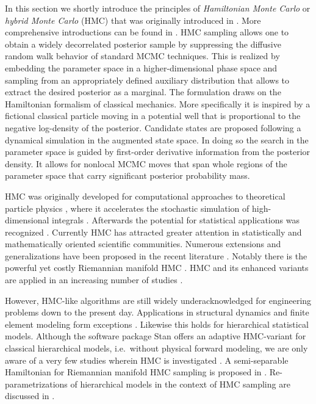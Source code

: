 In this section we shortly introduce the principles of \textit{Hamiltonian Monte Carlo} or \textit{hybrid Monte Carlo} (HMC) that was originally introduced in \cite{MCMC:Duane1987}.
More comprehensive introductions can be found in \cite{MCMC:Liu2004,MCMC:Neal2011,MCMC:SanzSerna2014}.
HMC sampling allows one to obtain a widely decorrelated posterior sample by suppressing the diffusive random walk behavior of standard MCMC techniques.
This is realized by embedding the parameter space in a higher-dimensional phase space and sampling from an appropriately defined auxiliary distribution that allows to extract the desired posterior as a marginal.
The formulation draws on the Hamiltonian formalism of classical mechanics.
More specifically it is inspired by a fictional classical particle moving in a potential well that is proportional to the negative log-density of the posterior.
Candidate states are proposed following a dynamical simulation in the augmented state space.
In doing so the search in the parameter space is guided by first-order derivative information from the posterior density.
It allows for nonlocal MCMC moves that span whole regions of the parameter space that carry significant posterior probability mass.
\par %
HMC was originally developed for computational approaches to theoretical particle physics \cite{MCMC:Duane1987},
where it accelerates the stochastic simulation of high-dimensional integrals \cite{Physics:Gattringer2010}.
Afterwards the potential for statistical applications was recognized \cite{MCMC:Neal1996:a}.
Currently HMC has attracted greater attention in statistically and mathematically oriented scientific communities.
Numerous extensions and generalizations have been proposed in the recent literature \cite{MCMC:Shahbaba2014,MCMC:Papamarkou2014,MCMC:SohlDickstein2014,MCMC:Campos2015}.
Notably there is the powerful yet costly Riemannian manifold HMC \cite{MCMC:Girolami2011,MCMC:Betancourt2013}.
HMC and its enhanced variants are applied in an increasing number of studies \cite{MCMC:Beskos2013:b,MCMC:Elsheikh2014:a,MCMC:Kramer2014}.
\par %
However, HMC-like algorithms are still widely underacknowledged for engineering problems down to the present day.
Applications in structural dynamics and finite element modeling form exceptions \cite{MCMC:Cheung2009,MCMC:Boulkaibet2015}.
Likewise this holds for hierarchical statistical models.
Although the software package Stan \cite{Computing:Stan2014} offers an adaptive HMC-variant \cite{MCMC:Hoffman2014} for classical hierarchical models, i.e.\ without physical forward modeling,
we are only aware of a very few studies wherein HMC is investigated \cite{MCMC:Zhang2014,MCMC:Betancourt2015}.
A semi-separable Hamiltonian for Riemannian manifold HMC sampling is proposed in \cite{MCMC:Zhang2014}.
Re-parametrizations of hierarchical models \cite{Multilevel:Papaspiliopoulos2007} in the context of HMC sampling are discussed in \cite{MCMC:Betancourt2015}.

